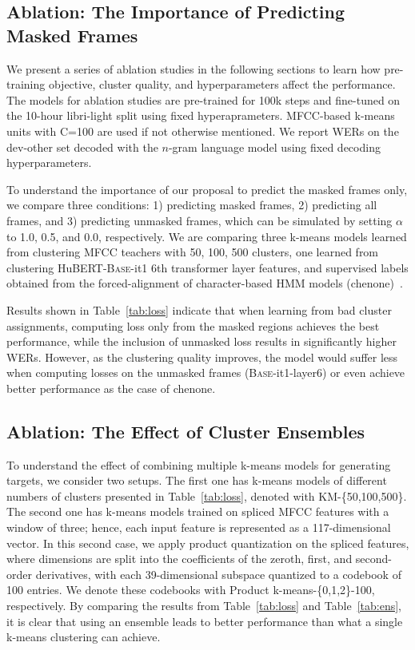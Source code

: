 \subsection{Ablation: The Importance of Predicting Masked Frames} We present a series of ablation studies in the following sections to learn how pre-training objective, cluster quality, and hyperparameters affect the performance. The models for ablation studies are pre-trained for 100k steps and fine-tuned on the 10-hour libri-light split using fixed hyperaprameters. MFCC-based k-means units with C=100 are used if not otherwise mentioned. We report WERs on the dev-other set decoded with the $n$-gram language model using fixed decoding hyperparameters.

To understand the importance of our proposal to predict the masked frames only, we compare three conditions: 1) predicting masked frames, 2) predicting all frames, and 3) predicting unmasked frames, which can be simulated by setting $\alpha$ to 1.0, 0.5, and 0.0, respectively. We are comparing three k-means models learned from clustering MFCC teachers with 50, 100, 500 clusters, one learned from clustering HuBERT-\textsc{Base}-it1 6th transformer layer features, and supervised labels obtained from the forced-alignment of character-based HMM models (chenone)~\cite{le2019senones}.

Results shown in Table~\ref{tab:loss} indicate that when learning from bad cluster assignments, computing loss only from the masked regions achieves the best performance, while the inclusion of unmasked loss results in significantly higher WERs. However, as the clustering quality improves, the model would suffer less when computing losses on the unmasked frames (\textsc{Base}-it1-layer6) or even achieve better performance as the case of chenone.

\subsection{Ablation: The Effect of Cluster Ensembles} To understand the effect of combining multiple k-means models for generating targets, we consider two setups. The first one has k-means models of different numbers of clusters presented in Table~\ref{tab:loss}, denoted with KM-\{50,100,500\}. The second one has k-means models trained on spliced MFCC features with a window of three; hence, each input feature is represented as a 117-dimensional vector. In this second case, we apply product quantization on the spliced features, where dimensions are split into the coefficients of the zeroth, first, and second-order derivatives, with each 39-dimensional subspace quantized to a codebook of 100 entries. We denote these codebooks with Product k-means-\{0,1,2\}-100, respectively. By comparing the results from Table~\ref{tab:loss} and Table~\ref{tab:ens}, it is clear that using an ensemble leads to better performance than what a single k-means clustering can achieve.


